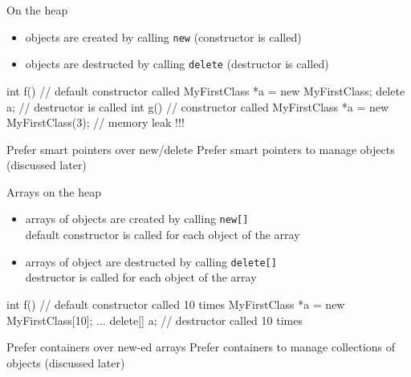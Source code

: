 \begin{frame}[fragile]
  \begin{block}{On the heap}
    \begin{itemize}
    \item objects are created by calling \texttt{new} (constructor is called)
    \item objects are destructed by calling \texttt{delete} (destructor is called)
    \end{itemize}
  \end{block}
  \begin{cppcode}
    int f() {
      // default constructor called
      MyFirstClass *a = new MyFirstClass;
      delete a; // destructor is called
    }
    int g() {
      // constructor called
      MyFirstClass *a = new MyFirstClass(3);
    } // memory leak !!!
  \end{cppcode}
  \begin{goodpractice}{Prefer smart pointers over new/delete}
    Prefer smart pointers to manage objects (discussed later)
  \end{goodpractice}
\end{frame}

\begin{frame}[fragile]
  \begin{block}{Arrays on the heap}
    \begin{itemize}
    \item arrays of objects are created by calling \texttt{new[]} \\
      default constructor is called for each object of the array
    \item arrays of object are destructed by calling \texttt{delete[]} \\
      destructor is called for each object of the array
    \end{itemize}
  \end{block}
  \begin{cppcode}
    int f() {
      // default constructor called 10 times
      MyFirstClass *a = new MyFirstClass[10];
      ...
      delete[] a; // destructor called 10 times
    }
  \end{cppcode}
  \begin{goodpractice}{Prefer containers over new-ed arrays}
    Prefer containers to manage collections of objects (discussed later)
  \end{goodpractice}
\end{frame}
